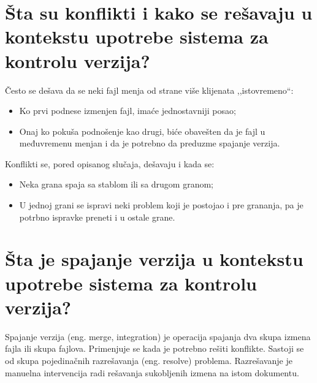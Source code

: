 \documentclass[a4paper]{article}
\begin{document}
\section{Šta su konflikti i kako se rešavaju u kontekstu upotrebe sistema za kontrolu verzija?}
  \noindent Često se dešava da se neki fajl menja od strane više klijenata ,,istovremeno``:
  \begin{itemize}
    \item Ko prvi podnese izmenjen fajl, imaće jednostavniji posao;
    \item Onaj ko pokuša podnošenje kao drugi, biće obavešten da je fajl u međuvremenu 
          menjan i da je potrebno da preduzme spajanje verzija.
  \end{itemize}
  Konflikti se, pored opisanog slučaja, dešavaju i kada se:
  \begin{itemize}
    \item Neka grana spaja sa stablom ili sa drugom granom;
    \item U jednoj grani se ispravi neki problem koji je postojao i pre grananja, 
          pa je potrbno ispravke preneti i u ostale grane.
  \end{itemize}
\section{Šta je spajanje verzija u kontekstu upotrebe sistema za kontrolu verzija?}
  Spajanje verzija (eng. merge, integration) je operacija spajanja dva skupa izmena fajla ili 
  skupa fajlova. Primenjuje se kada je potrebno rešiti konflikte. Sastoji se od skupa pojedinačnih 
  razrešavanja (eng. resolve) problema. Razrešavanje je manuelna intervencija radi rešavanja 
  sukobljenih izmena na istom dokumentu.
  
\end{document}
